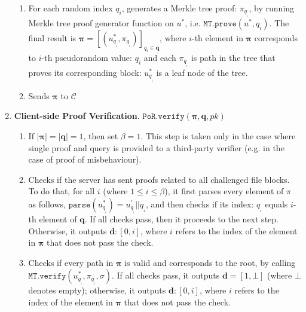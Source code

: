 \begin{enumerate}
\begin{enumerate}
\item For each random index $q_{\scriptscriptstyle i}$, generates a Merkle tree proof: $\pi_{\scriptscriptstyle{q_{_{\scriptscriptstyle i}}}}$, by  running Merkle tree proof generator function on $u^{\scriptscriptstyle *}$, i.e. $\mathtt{MT.prove}(u^{*},q_{\scriptscriptstyle i})$. The final result  is $ {\bm{\pi}}=[(u^{\scriptscriptstyle *}_{\scriptscriptstyle q_{_{\scriptscriptstyle i}}},\pi_{\scriptscriptstyle q_{_{\scriptscriptstyle i}}})]_{\scriptscriptstyle q_{\scriptscriptstyle i}\in {\bm{q}}}$, where $i$-th element in $ {\bm{\pi}}$ corresponds to $i$-th pseudorandom value: $q_{\scriptscriptstyle i}$ and   each $\pi_{\scriptscriptstyle{q_{_{\scriptscriptstyle i}}}}$ is path in the tree that proves its corresponding block: $u^{\scriptscriptstyle *}_{\scriptscriptstyle q_{_{\scriptscriptstyle i}}}$ is a leaf node of the  tree. 

\item Sends $ {\bm{\pi}}$ to $\mathcal{C}$
 \end{enumerate}
\item\label{PoR-verify}\textbf{Client-side Proof Verification}. $\mathtt{PoR.verify}( {\bm{\pi}},\bm{q},pk)$ 
\begin{enumerate}

\item If $|\bm{\pi}|=|\bm{q}|=1$, then set $\beta=1$. This step is taken only in the case where single proof and query is provided to a third-party verifier (e.g. in the case of proof of misbehaviour). 
\item Checks if the server has sent proofs related to all challenged file blocks. To do that, for all $i$ (where $1\leq i\leq \beta$),  it first parses every  element of $\pi$ as follows, $\mathtt{parse}(u^{\scriptscriptstyle *}_{\scriptscriptstyle q_{_{\scriptscriptstyle i}}})=u^{\scriptscriptstyle '}_{\scriptscriptstyle q_{_{\scriptscriptstyle i}}}||q_{_{\scriptscriptstyle i}}$, and then checks if its index: $q_{_{\scriptscriptstyle i}}$ equals $i$-th element of $ {\bm{q}}$. If all checks pass, then it proceeds to the next step. Otherwise,  it outputs $ {\bm{d}}:[0,i]$, where $i$ refers to the index of the  element in $ {\bm{\pi}}$ that does not pass the check. 


\item Checks if every path in  $ {\bm{\pi}}$ is valid and corresponds to the root, by calling $\mathtt{MT.verify}(u^{\scriptscriptstyle *}_{\scriptscriptstyle q_{_{\scriptscriptstyle i}}},\pi_{\scriptscriptstyle q_{_{\scriptscriptstyle i}}},\sigma)$. If all checks pass, it outputs $ {\bm{d}}=[1,\bot]$ (where $\bot$ denotes empty); otherwise, it outputs $ {\bm{d}}:[0,i]$, where $i$ refers to the index of the  element in $ {\bm{\pi}}$ that does not pass the check. 
\end{enumerate}
\end{enumerate}



